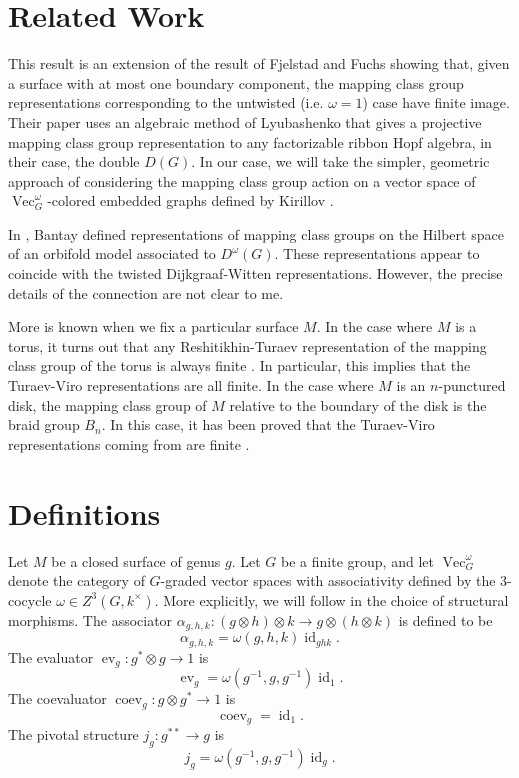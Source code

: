 \documentclass{amsart}
\DeclareMathOperator{\id}{id}
\DeclareMathOperator{\Vect}{Vec}
\DeclareMathOperator{\coev}{coev}
\DeclareMathOperator{\ev}{ev}
\begin{document}
\section{Related Work}

This result is an extension of the result of Fjelstad and Fuchs \cite{fjfu} showing that, given a surface with at most one boundary component, the mapping class group representations corresponding to the untwisted (i.e. $\omega = 1$) case have finite image.  Their paper uses an algebraic method of Lyubashenko \cite{Lyubashenko1996} that gives a projective mapping class group representation to any factorizable ribbon Hopf algebra, in their case, the double $D(G)$. In our case, we will take the simpler, geometric approach of considering the mapping class group action on a vector space of $\Vect_G^\omega$-colored embedded graphs defined by Kirillov \cite{kirillovStringNets}. 

In \cite{bantay}, Bantay defined representations of mapping class groups on the Hilbert space of an orbifold model associated to $D^\omega(G)$.  These representations appear to coincide with the twisted Dijkgraaf-Witten representations. However, the precise details of the connection are not clear to me.

More is known when we fix a particular surface $M$. In the case where $M$ is a torus, it turns out that any Reshitikhin-Turaev representation of the mapping class group of the torus is always finite \cite{0806.2493}.  In particular, this implies that the Turaev-Viro representations are all finite.  In the case where $M$ is an $n$-punctured disk, the mapping class group of $M$ relative to the boundary of the disk is the braid group $B_n$.  In this case, it has been proved that the Turaev-Viro representations coming from  are finite \cite{erw}.

\section{Definitions}

Let $M$ be a closed surface of genus $g$.  Let $G$ be a finite group, and let $\Vect_G^\omega$ denote the category of $G$-graded vector spaces with associativity defined by the  3-cocycle $\omega \in Z^3(G, k^\times)$.  More explicitly, we will follow \cite{math/0601012} in the choice of structural morphisms.  The associator $\alpha_{g,h,k}:(g \otimes h) \otimes k \to g \otimes (h \otimes k)$ is defined to be
$$\alpha_{g,h,k} = \omega(g,h,k) \id_{ghk}.$$ 
The evaluator $\ev_g:g^* \otimes g \to 1$ is 
$$\ev_g = \omega(g^{-1},g,g^{-1}) \id_1.$$  
The coevaluator $\coev_g:g \otimes g^* \to 1$ is 
$$\coev_g = \id_1.$$ 
The pivotal structure $j_g:g^{**} \to g$ is 
$$j_g = \omega(g^{-1},g,g^{-1}) \id_{g}.$$
\end{document}
